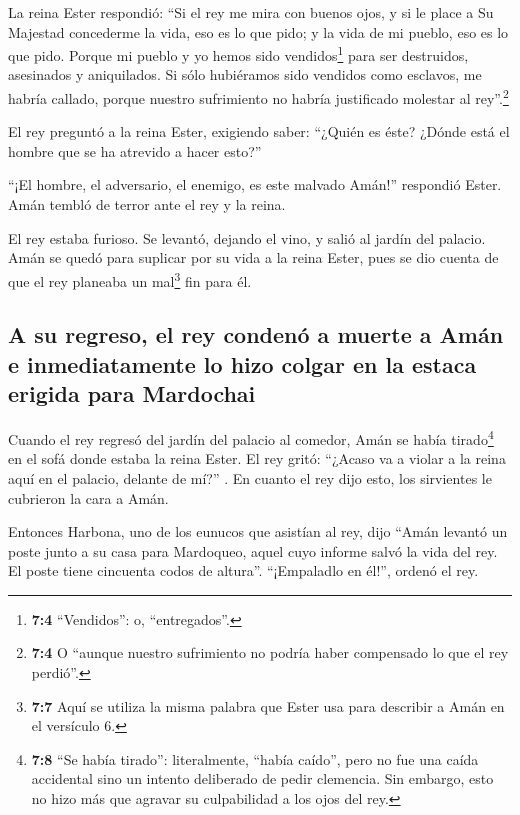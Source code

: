  La reina Ester respondió: ``Si el rey me mira con buenos
ojos, y si le place a Su Majestad concederme la vida, eso es lo que
pido; y la vida de mi pueblo, eso es lo que pido.  Porque
mi pueblo y yo hemos sido vendidos\footnote{\textbf{7:4} ``Vendidos'':
  o, ``entregados''.} para ser destruidos, asesinados y aniquilados. Si
sólo hubiéramos sido vendidos como esclavos, me habría callado, porque
nuestro sufrimiento no habría justificado molestar al rey''.\footnote{\textbf{7:4}
  O ``aunque nuestro sufrimiento no podría haber compensado lo que el
  rey perdió''.}

 El rey preguntó a la reina Ester, exigiendo saber:
``¿Quién es éste? ¿Dónde está el hombre que se ha atrevido a hacer
esto?''

 ``¡El hombre, el adversario, el enemigo, es este malvado
Amán!'' respondió Ester. Amán tembló de terror ante el rey y la reina.

 El rey estaba furioso. Se levantó, dejando el vino, y
salió al jardín del palacio. Amán se quedó para suplicar por su vida a
la reina Ester, pues se dio cuenta de que el rey planeaba un
mal\footnote{\textbf{7:7} Aquí se utiliza la misma palabra que Ester usa
  para describir a Amán en el versículo 6.} fin para él.

\hypertarget{a-su-regreso-el-rey-condenuxf3-a-muerte-a-amuxe1n-e-inmediatamente-lo-hizo-colgar-en-la-estaca-erigida-para-mardochai}{%
\subsection{A su regreso, el rey condenó a muerte a Amán e
inmediatamente lo hizo colgar en la estaca erigida para
Mardochai}\label{a-su-regreso-el-rey-condenuxf3-a-muerte-a-amuxe1n-e-inmediatamente-lo-hizo-colgar-en-la-estaca-erigida-para-mardochai}}

 Cuando el rey regresó del jardín del palacio al comedor,
Amán se había tirado\footnote{\textbf{7:8} ``Se había tirado'':
  literalmente, ``había caído'', pero no fue una caída accidental sino
  un intento deliberado de pedir clemencia. Sin embargo, esto no hizo
  más que agravar su culpabilidad a los ojos del rey.} en el sofá donde
estaba la reina Ester. El rey gritó: ``¿Acaso va a violar a la reina
aquí en el palacio, delante de mí?'' . En cuanto el rey dijo esto, los
sirvientes le cubrieron la cara a Amán.

 Entonces Harbona, uno de los eunucos que asistían al rey,
dijo ``Amán levantó un poste junto a su casa para Mardoqueo, aquel cuyo
informe salvó la vida del rey. El poste tiene cincuenta codos de
altura''. ``¡Empaladlo en él!'', ordenó el rey.

